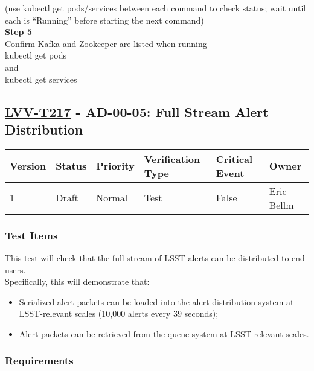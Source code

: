 (use kubectl get pods/services between each command to check status;
wait until each is ``Running'' before starting the next
command)\\[4\baselineskip]\textbf{Step 5}\\
Confirm Kafka and Zookeeper are listed when
running\\[2\baselineskip]kubectl get
pods\\[2\baselineskip]and\\[2\baselineskip]kubectl get
services\\[2\baselineskip]

\hypertarget{lvv-t217---ad-00-05-full-stream-alert-distribution}{\subsection{\texorpdfstring{\href{https://jira.lsstcorp.org/secure/Tests.jspa\#/testCase/LVV-T217}{LVV-T217}
- AD-00-05: Full Stream Alert
Distribution}{LVV-T217 - AD-00-05: Full Stream Alert Distribution}}\label{lvv-t217---ad-00-05-full-stream-alert-distribution}}

\begin{longtable}[]{@{}llllll@{}}
\toprule
Version & Status & Priority & Verification Type & Critical Event &
Owner\tabularnewline
\midrule
\endhead
1 & Draft & Normal & Test & False & Eric Bellm\tabularnewline
\bottomrule
\end{longtable}

\subsubsection{Test Items}\label{test-items-7}

This test will check that the full stream of LSST alerts can be
distributed to end users.\\[2\baselineskip]Specifically, this will
demonstrate that:

\begin{itemize}
\tightlist
\item
  Serialized alert packets can be loaded into the alert distribution
  system at LSST-relevant scales (10,000 alerts every 39 seconds);
\item
  Alert packets can be retrieved from the queue system at LSST-relevant
  scales.
\end{itemize}

\subsubsection{Requirements}\label{requirements-7}

